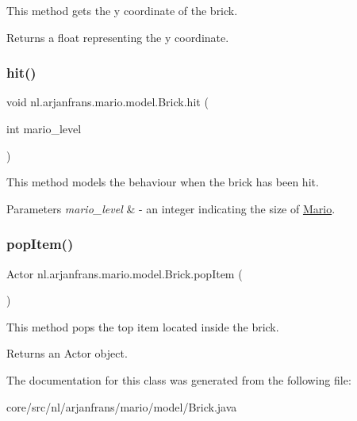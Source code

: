 This method gets the y coordinate of the brick. 

\begin{DoxyReturn}{Returns}
a float representing the y coordinate. 
\end{DoxyReturn}
\mbox{\label{classnl_1_1arjanfrans_1_1mario_1_1model_1_1Brick_aeca0f5bee7ddc1377fd85e60e8341590}} 
\subsubsection{\texorpdfstring{hit()}{hit()}}
{\footnotesize\ttfamily void nl.\+arjanfrans.\+mario.\+model.\+Brick.\+hit (\begin{DoxyParamCaption}\item[{int}]{mario\+\_\+level }\end{DoxyParamCaption})}



This method models the behaviour when the brick has been hit. 


\begin{DoxyParams}{Parameters}
{\em mario\+\_\+level} & -\/ an integer indicating the size of \hyperlink{classnl_1_1arjanfrans_1_1mario_1_1model_1_1Mario}{Mario}. \\
\hline
\end{DoxyParams}
\mbox{\label{classnl_1_1arjanfrans_1_1mario_1_1model_1_1Brick_aae68460b9c629b1bc3b81bbcdc168554}} 
\subsubsection{\texorpdfstring{pop\+Item()}{popItem()}}
{\footnotesize\ttfamily Actor nl.\+arjanfrans.\+mario.\+model.\+Brick.\+pop\+Item (\begin{DoxyParamCaption}{ }\end{DoxyParamCaption})}



This method pops the top item located inside the brick. 

\begin{DoxyReturn}{Returns}
an Actor object. 
\end{DoxyReturn}


The documentation for this class was generated from the following file\+:\begin{DoxyCompactItemize}
\item 
core/src/nl/arjanfrans/mario/model/Brick.\+java\end{DoxyCompactItemize}
